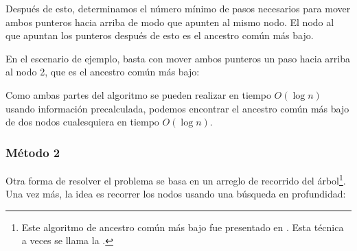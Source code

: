 Después de esto, determinamos el número mínimo de pasos
necesarios para mover ambos punteros hacia arriba de modo que
apunten al mismo nodo.
El nodo al que apuntan los punteros después de esto
es el ancestro común más bajo.

En el escenario de ejemplo, basta con mover ambos punteros
un paso hacia arriba al nodo 2,
que es el ancestro común más bajo:

\begin{center}
\end{center}

Como ambas partes del algoritmo se pueden realizar en
tiempo $O(\log n)$ usando información precalculada,
podemos encontrar el ancestro común más bajo de dos
nodos cualesquiera en tiempo $O(\log n)$.

\subsubsection{Método 2}

Otra forma de resolver el problema se basa en
un arreglo de recorrido del árbol\footnote{Este algoritmo de ancestro común más bajo fue presentado en \cite{ben00}.
Esta técnica a veces se llama la 
 \cite{tar84}.}.
Una vez más, la idea es recorrer los nodos
usando una búsqueda en profundidad:

